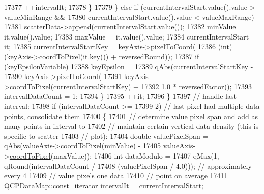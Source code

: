 \begin{DoxyCode}
17377               ++intervalIt;
17378             \}
17379           \} \textcolor{keywordflow}{else} \textcolor{keywordflow}{if} (currentIntervalStart.value().value > valueMinRange &&
17380                      currentIntervalStart.value().value < valueMaxRange)
17381             scatterData->append(currentIntervalStart.value());
17382           minValue = it.value().value;
17383           maxValue = it.value().value;
17384           currentIntervalStart = it;
17385           currentIntervalStartKey = keyAxis->\hyperlink{class_q_c_p_axis_ae9289ef7043b9d966af88eaa95b037d1}{pixelToCoord}(
17386               (\textcolor{keywordtype}{int})(keyAxis->\hyperlink{class_q_c_p_axis_a985ae693b842fb0422b4390fe36d299a}{coordToPixel}(it.key()) + reversedRound));
17387           \textcolor{keywordflow}{if} (keyEpsilonVariable)
17388             keyEpsilon =
17389                 qAbs(currentIntervalStartKey -
17390                      keyAxis->\hyperlink{class_q_c_p_axis_ae9289ef7043b9d966af88eaa95b037d1}{pixelToCoord}(
17391                          keyAxis->\hyperlink{class_q_c_p_axis_a985ae693b842fb0422b4390fe36d299a}{coordToPixel}(currentIntervalStartKey) +
17392                          1.0 * reversedFactor));
17393           intervalDataCount = 1;
17394         \}
17395         ++it;
17396       \}
17397       \textcolor{comment}{// handle last interval:}
17398       \textcolor{keywordflow}{if} (intervalDataCount >=
17399           2) \textcolor{comment}{// last pixel had multiple data points, consolidate them}
17400       \{
17401         \textcolor{comment}{// determine value pixel span and add as many points in interval to}
17402         \textcolor{comment}{// maintain certain vertical data density (this is specific to scatter}
17403         \textcolor{comment}{// plot):}
17404         \textcolor{keywordtype}{double} valuePixelSpan = qAbs(valueAxis->\hyperlink{class_q_c_p_axis_a985ae693b842fb0422b4390fe36d299a}{coordToPixel}(minValue) -
17405                                      valueAxis->\hyperlink{class_q_c_p_axis_a985ae693b842fb0422b4390fe36d299a}{coordToPixel}(maxValue));
17406         \textcolor{keywordtype}{int} dataModulo =
17407             qMax(1, qRound(intervalDataCount /
17408                            (valuePixelSpan / 4.0))); \textcolor{comment}{// approximately every 4}
17409                                                      \textcolor{comment}{// value pixels one data}
17410                                                      \textcolor{comment}{// point on average}
17411         QCPDataMap::const\_iterator intervalIt = currentIntervalStart;

\end{DoxyCode}
